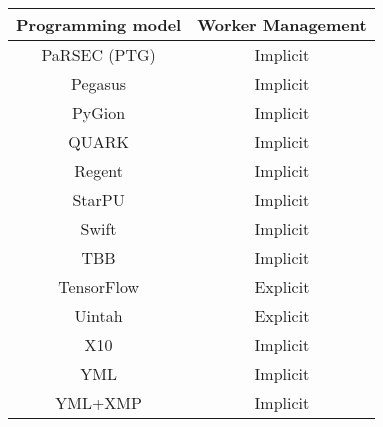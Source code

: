 \begin{tabular}{cc}
\hline
Programming model & Worker Management \\
\hline
PaRSEC (PTG) & Implicit\\
Pegasus & Implicit\\
PyGion & Implicit\\
QUARK & Implicit\\
Regent & Implicit\\
StarPU & Implicit\\
Swift & Implicit\\
TBB & Implicit\\
TensorFlow & Explicit\\
Uintah & Explicit\\
X10 & Implicit\\
YML & Implicit\\
YML+XMP & Implicit\\
\hline
\end{tabular}
